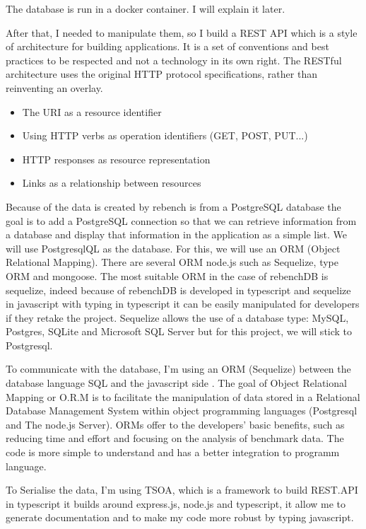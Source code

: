 \documentclass{article}
\begin{document}
The database is run in a docker container. I will explain it later.

After that, I needed to manipulate them, so I build a REST API which is a style of architecture for building applications. It is a set of conventions and best practices to be respected and not a technology in its own right. The RESTful architecture uses the original HTTP protocol specifications, rather than reinventing an overlay.

\begin{itemize}
    \item The URI as a resource identifier
    \item Using HTTP verbs as operation identifiers (GET, POST, PUT...)
    \item HTTP responses as resource representation
    \item Links as a relationship between resources
\end{itemize}

Because of the data is created by rebench is from a PostgreSQL database the goal is to add a PostgreSQL connection so that we can retrieve information from a database and display that information in the application as a simple list.
We will use PostgresqlQL as the database. For this, we will use an ORM (Object Relational Mapping). There are several ORM node.js such as Sequelize, type ORM and mongoose. The most suitable ORM in the case of rebenchDB is sequelize, indeed because of rebenchDB is developed in typescript and sequelize in javascript with typing in typescript it can be easily manipulated for developers if they retake the project. Sequelize allows the use of a database type: MySQL, Postgres, SQLite and Microsoft SQL Server but for this project, we will stick to Postgresql.

To communicate with the database, I'm using an ORM (Sequelize) between the database language SQL and the javascript side \citep{pereira2016working}. The goal of Object Relational Mapping or O.R.M is to facilitate the manipulation of data stored in a Relational Database Management System within object programming languages (Postgresql and The node.js Server). ORMs offer to the developers' basic benefits, such as reducing time and effort and focusing on the analysis of benchmark data. The code is more simple to understand and has a better integration to programm language.


To Serialise the data, I'm using TSOA, which is a framework to build REST.API in typescript it builds around express.js, node.js and typescript, it allow me to generate documentation and to make my code more robust by typing javascript.
\end{document}
